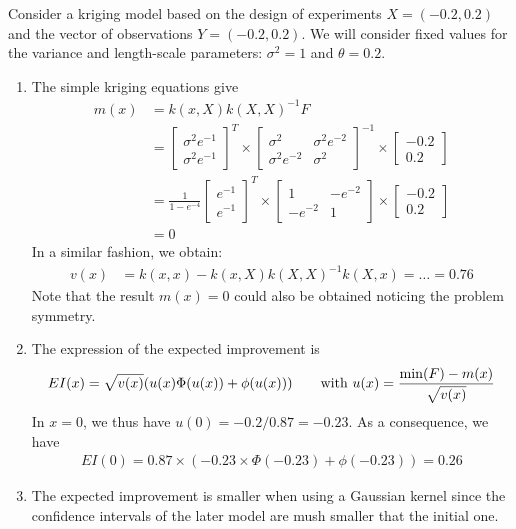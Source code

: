 \documentclass[a4paper,10pt]{article}
\begin{document}
Consider a kriging model based on the design of experiments $X=(-0.2,0.2)$ and the vector of observations $Y=(-0.2,0.2)$. We will consider fixed values for the variance and length-scale parameters: $\sigma^2=1$ and $\theta=0.2$.
\begin{enumerate}[label=Q\arabic*.]
\item The simple kriging equations give 
\begin{align*}
	m(x) &= k(x,X)k(X,X)^{-1}F\\
	& = 
	 \left[ \begin{array}{ccc} \sigma^2 e^{-1} \\ \sigma^2e^{-1} \end{array}\right]^T 
	 \times \left[ \begin{array}{ccc}  \sigma^2 & \sigma^2e^{-2} \\ \sigma^2e^{-2} & \sigma^2   \end{array} \right] ^{-1} 
	 \times \left[ \begin{array}{ccc} -0.2 \\ 0.2 \end{array} \right]\\
	& = \frac{1}{1 - e^{-4}} \left[ \begin{array}{ccc} e^{-1} \\ e^{-1} \end{array}\right]^T
	 \times \left[ \begin{array}{ccc}  1 & -e^{-2} \\ -e^{-2} & 1   \end{array} \right]
	 \times \left[ \begin{array}{ccc} -0.2 \\ 0.2 \end{array} \right]\\
	& = 0 
\end{align*}
In a similar fashion, we obtain:
\begin{align*}
	v(x) &= k(x,x) - k(x,X)k(X,X)^{-1}k(X,x) = \dots = 0.76 
\end{align*}
Note that the result $m(x)=0$ could also be obtained noticing the problem symmetry. 

\item The expression of the expected improvement is
\begin{align*}
	EI(x) = \sqrt{v(x)} (u(x) \Phi(u(x)) + \phi(u(x)))  \text{\qquad with } u(x) = \frac{\min(F) - m(x)}{\sqrt{v(x)}}
\end{align*}
In $x=0$, we thus have $u(0)= -0.2/0.87 = -0.23$. As a consequence, we have
\begin{align*}
	EI(0) = 0.87 \times (-0.23 \times \Phi(-0.23) + \phi(-0.23)) = 0.26
\end{align*}

\item The expected improvement is smaller when using a Gaussian kernel since the confidence intervals of the later model are mush smaller that the initial one.
  \end{enumerate}
\end{document}
